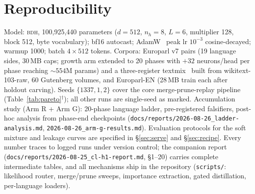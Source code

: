 \documentclass[11pt]{article}
\theoremstyle{definition}\newtheorem{definition}{Definition}
\theoremstyle{remark}\newtheorem{remark}{Remark}
\newcommand{\BDH}{\textsc{bdh}}
\begin{document}
\section{Reproducibility}
Model: \BDH{}, 100{,}925{,}440 parameters ($d{=}512$, $n_h{=}8$, $L{=}6$, multiplier 128,
block 512, byte vocabulary); bf16 autocast; AdamW~\cite{adamw} peak lr $10^{-3}$ cosine-decayed; warmup
1000; batch $4\times512$ tokens. Corpora: Europarl v7 pairs (19 language sides, 30\,MB
caps; growth arm extended to 20 phases with $+32$ neurons/head per phase reaching
${\sim}554$M params) and a three-register textmix~\cite{wikitext,europarl,gutenberg} built from wikitext-103-raw, 60 Gutenberg volumes, and
Europarl-EN (28\,MB train each after holdout carving). Seeds $\{1337,1,2\}$ cover the core
merge-prune-replay pipeline (Table~\ref{tab:pareto}$^\dagger$); all other runs are
single-seed as marked. Accumulation study (Arm R + Arm G): 20-phase language ladder,
pre-registered falsifiers, post-hoc analysis from phase-end checkpoints
(\texttt{docs/reports/2026-08-26\_ladder-analysis.md},
\texttt{2026-08-26\_arm-g-results.md}). Evaluation protocols for the soft mixture and leakage curves are
specified in \S\ref{sec:serve} and \S\ref{sec:recipe}. Every number traces to logged runs
under version control; the companion report (\texttt{docs/reports/2026-08-25\_cl-h1-report.md},
\S1--20) carries complete intermediate tables, and all mechanisms ship in the repository
(\texttt{scripts/}: likelihood router, merge/prune sweeps, importance extraction, gated
distillation, per-language loaders).
\end{document}

